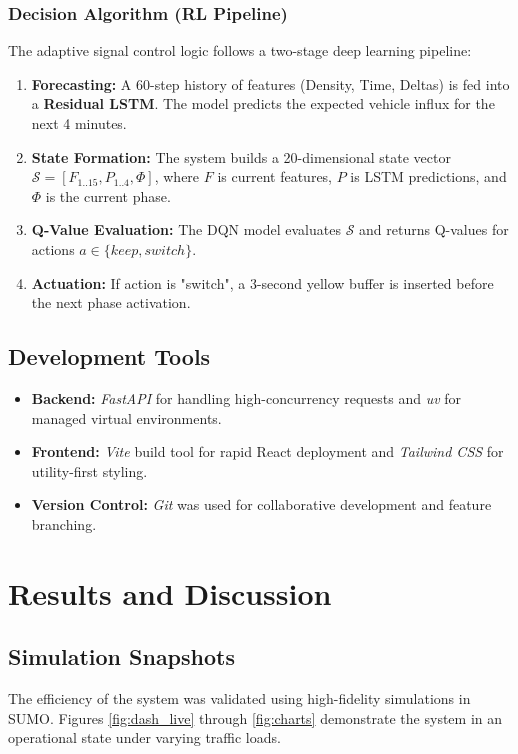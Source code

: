 \documentclass[12pt,a4paper]{report}
\begin{document}
\subsection{Decision Algorithm (RL Pipeline)}
The adaptive signal control logic follows a two-stage deep learning pipeline:
\begin{enumerate}
    \item \textbf{Forecasting:} A 60-step history of features (Density, Time, Deltas) is fed into a \textbf{Residual LSTM}. The model predicts the expected vehicle influx for the next 4 minutes.
    \item \textbf{State Formation:} The system builds a 20-dimensional state vector $\mathcal{S} = [F_{1..15}, P_{1..4}, \Phi]$, where $F$ is current features, $P$ is LSTM predictions, and $\Phi$ is the current phase.
    \item \textbf{Q-Value Evaluation:} The DQN model evaluates $\mathcal{S}$ and returns Q-values for actions $a \in \{keep, switch\}$.
    \item \textbf{Actuation:} If action is "switch", a 3-second yellow buffer is inserted before the next phase activation.
\end{enumerate}

\section{Development Tools}
\begin{itemize}
    \item \textbf{Backend:} \textit{FastAPI} for handling high-concurrency requests and \textit{uv} for managed virtual environments.
    \item \textbf{Frontend:} \textit{Vite} build tool for rapid React deployment and \textit{Tailwind CSS} for utility-first styling.
    \item \textbf{Version Control:} \textit{Git} was used for collaborative development and feature branching.
\end{itemize}

\chapter{Results and Discussion}
\section{Simulation Snapshots}
The efficiency of the system was validated using high-fidelity simulations in SUMO. Figures \ref{fig:dash_live} through \ref{fig:charts} demonstrate the system in an operational state under varying traffic loads.
\end{document}
